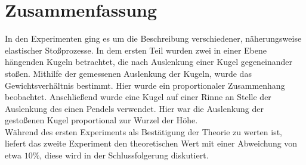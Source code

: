 
\section{Zusammenfassung}
In den Experimenten ging es um die Beschreibung verschiedener, näherungsweise elastischer  Stoßprozesse.  In dem ersten Teil wurden zwei in einer Ebene hängenden Kugeln betrachtet, die nach Auslenkung einer Kugel gegeneinander stoßen. Mithilfe der gemessenen Auslenkung der Kugeln, wurde das Gewichtsverhältnis bestimmt. Hier wurde ein proportionaler Zusammenhang beobachtet. Anschließend wurde eine Kugel auf einer Rinne an Stelle der Auslenkung des einen Pendels verwendet. Hier war die Auslenkung der gestoßenen Kugel proportional zur Wurzel der Höhe.\\
Während des ersten Experiments als Bestätigung der Theorie zu werten ist, liefert das zweite Experiment den theoretischen Wert mit einer Abweichung von etwa $10\%$, diese wird in der Schlussfolgerung diskutiert.


